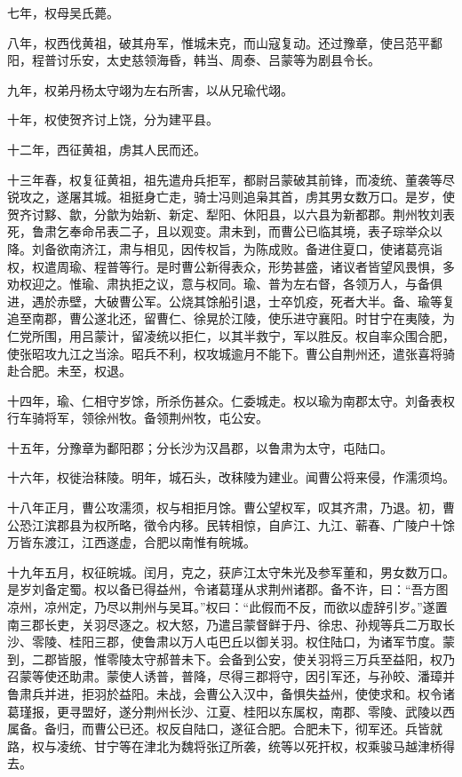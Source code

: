 \documentclass[12pt,UTF8]{ctexbook}
\begin{document}
七年，权母吴氏薨。

八年，权西伐黄祖，破其舟军，惟城未克，而山寇复动。还过豫章，使吕范平鄱阳，程普讨乐安，太史慈领海昏，韩当、周泰、吕蒙等为剧县令长。

九年，权弟丹杨太守翊为左右所害，以从兄瑜代翊。

十年，权使贺齐讨上饶，分为建平县。

十二年，西征黄祖，虏其人民而还。

十三年春，权复征黄祖，祖先遣舟兵拒军，都尉吕蒙破其前锋，而凌统、董袭等尽锐攻之，遂屠其城。祖挺身亡走，骑士冯则追枭其首，虏其男女数万口。是岁，使贺齐讨黟、歙，分歙为始新、新定、犁阳、休阳县，以六县为新都郡。荆州牧刘表死，鲁肃乞奉命吊表二子，且以观变。肃未到，而曹公已临其境，表子琮举众以降。刘备欲南济江，肃与相见，因传权旨，为陈成败。备进住夏口，使诸葛亮诣权，权遣周瑜、程普等行。是时曹公新得表众，形势甚盛，诸议者皆望风畏惧，多劝权迎之。惟瑜、肃执拒之议，意与权同。瑜、普为左右督，各领万人，与备俱进，遇於赤壁，大破曹公军。公烧其馀船引退，士卒饥疫，死者大半。备、瑜等复追至南郡，曹公遂北还，留曹仁、徐晃於江陵，使乐进守襄阳。时甘宁在夷陵，为仁党所围，用吕蒙计，留凌统以拒仁，以其半救宁，军以胜反。权自率众围合肥，使张昭攻九江之当涂。昭兵不利，权攻城逾月不能下。曹公自荆州还，遣张喜将骑赴合肥。未至，权退。

十四年，瑜、仁相守岁馀，所杀伤甚众。仁委城走。权以瑜为南郡太守。刘备表权行车骑将军，领徐州牧。备领荆州牧，屯公安。

十五年，分豫章为鄱阳郡；分长沙为汉昌郡，以鲁肃为太守，屯陆口。

十六年，权徙治秣陵。明年，城石头，改秣陵为建业。闻曹公将来侵，作濡须坞。

十八年正月，曹公攻濡须，权与相拒月馀。曹公望权军，叹其齐肃，乃退。初，曹公恐江滨郡县为权所略，徵令内移。民转相惊，自庐江、九江、蕲春、广陵户十馀万皆东渡江，江西遂虚，合肥以南惟有皖城。

十九年五月，权征皖城。闰月，克之，获庐江太守朱光及参军董和，男女数万口。是岁刘备定蜀。权以备已得益州，令诸葛瑾从求荆州诸郡。备不许，曰：“吾方图凉州，凉州定，乃尽以荆州与吴耳。”权曰：“此假而不反，而欲以虚辞引岁。”遂置南三郡长吏，关羽尽逐之。权大怒，乃遣吕蒙督鲜于丹、徐忠、孙规等兵二万取长沙、零陵、桂阳三郡，使鲁肃以万人屯巴丘以御关羽。权住陆口，为诸军节度。蒙到，二郡皆服，惟零陵太守郝普未下。会备到公安，使关羽将三万兵至益阳，权乃召蒙等使还助肃。蒙使人诱普，普降，尽得三郡将守，因引军还，与孙皎、潘璋并鲁肃兵并进，拒羽於益阳。未战，会曹公入汉中，备惧失益州，使使求和。权令诸葛瑾报，更寻盟好，遂分荆州长沙、江夏、桂阳以东属权，南郡、零陵、武陵以西属备。备归，而曹公已还。权反自陆口，遂征合肥。合肥未下，彻军还。兵皆就路，权与凌统、甘宁等在津北为魏将张辽所袭，统等以死扞权，权乘骏马越津桥得去。
\end{document}
